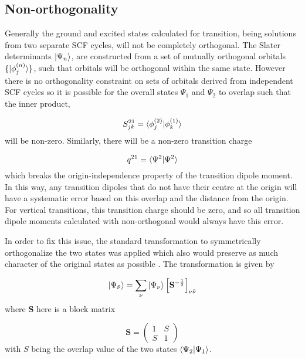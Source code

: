 \subsection{Non-orthogonality}
\label{subsec:dscf_nonorth}
Generally the ground and excited states calculated for \dscf transition, being solutions
from two separate SCF cycles, will not be completely orthogonal. The Slater determinants
$\ket{\Psi_n}$, are constructed from a set of mutually orthogonal orbitals $\{ \ket{\phi_j^{\left(n\right)}} \}$,
such that orbitals will be orthogonal within the same state. However there is no 
orthogonality constraint on sets of orbitals derived from independent SCF cycles
so it is possible for the overall states $\Psi_1$ and $\Psi_2$ to overlap such 
that the inner product,

\begin{equation}
S^{21}_{jk} = \braket{\phi_j^{\left(2\right)} | \phi_k^{\left(1\right)}}
\end{equation}
%
will be non-zero. Similarly, there will be a non-zero transition charge

\begin{equation}
q^{21} = \braket{\Psi^2|\Psi^2}
\end{equation}
%
which breaks the origin-independence property of the transition dipole moment. In
this way, any transition dipoles that do not have their centre at the origin will
have a systematic error based on this overlap and the distance from the origin.
For vertical transitions, this transition charge should be zero, and so all transition
dipole moments calculated with non-orthogonal \dscf would always have this error.

In order to fix this issue, the standard transformation to symmetrically orthogonalize 
the two states was applied which also would preserve as much character of the original
states as possible \cite{Lowdin1950}. The transformation is given by

\begin{equation}
\ket{\Psi_{\tilde{\nu}}} = \sum_{\nu} \ket{\Psi_\nu} \left[\mathbf{S}^{-\frac{1}{2}} \right]_{\nu\tilde{\nu}}
\end{equation}
%
where $\mathbf{S}$ here is a block matrix

\begin{equation}
\mathbf{S} = \begin{pmatrix}
    1 & S \\
    S & 1 
\end{pmatrix}
\end{equation}
%
with $S$ being the overlap value of the two states $\braket{\Psi_2|\Psi_1}$.

